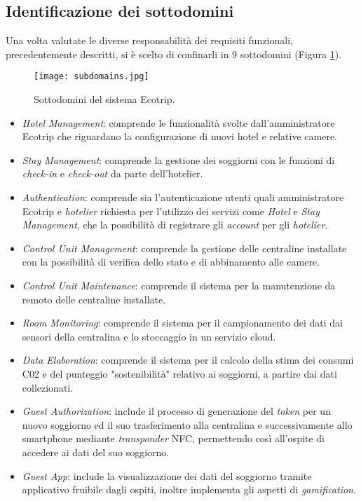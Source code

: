 \subsection{Identificazione dei sottodomini}
Una volta valutate le diverse responsabilità dei requisiti funzionali, precedentemente descritti, si è scelto di confinarli in 9 sottodomini (Figura \ref*{fig:subdomains}).
\begin{figure}[H]
    \texttt{[image: subdomains.jpg]}
    \centering
    \caption[subdomains]{Sottodomini del sistema Ecotrip.}
    \label{fig:subdomains}
\end{figure}
\begin{itemize}
    \item \textit{Hotel Management}: comprende le funzionalità svolte dall'amministratore Ecotrip che riguardano la configurazione di nuovi hotel e relative camere.
    \item \textit{Stay Management}: comprende la gestione dei soggiorni con le funzioni di \textit{check-in} e \textit{check-out} da parte dell'hotelier.
    \item \textit{Authentication}: comprende sia l'autenticazione utenti quali amministratore Ecotrip e \textit{hotelier} richiesta per l'utilizzo dei servizi come \textit{Hotel} e \textit{Stay Management}, che la possibilità di registrare gli \textit{account} per gli \textit{hotelier}.
    \item \textit{Control Unit Management}: comprende la gestione delle centraline installate con la possibilità di verifica dello stato e di abbinamento alle camere.
    \item \textit{Control Unit Maintenance}: comprende il sistema per la manutenzione da remoto delle centraline installate.
    \item \textit{Room Monitoring}: comprende il sistema per il campionamento dei dati dai sensori della centralina e lo stoccaggio in un servizio cloud.
    \item \textit{Data Elaboration}: comprende il sistema per il calcolo della stima dei consumi C02 e del punteggio "sostenibilità" relativo ai soggiorni, a partire dai dati collezionati.
    \item \textit{Guest Authorization}: include il processo di generazione del \textit{token} per un nuovo soggiorno ed il suo trasferimento alla centralina e successivamente allo smartphone mediante \textit{transponder} NFC, permettendo così all'ospite di accedere ai dati del suo soggiorno.
    \item \textit{Guest App}: include la visualizzazione dei dati del soggiorno tramite applicativo fruibile dagli ospiti, inoltre implementa gli aspetti di \textit{gamification}.
\end{itemize}

\newpage

